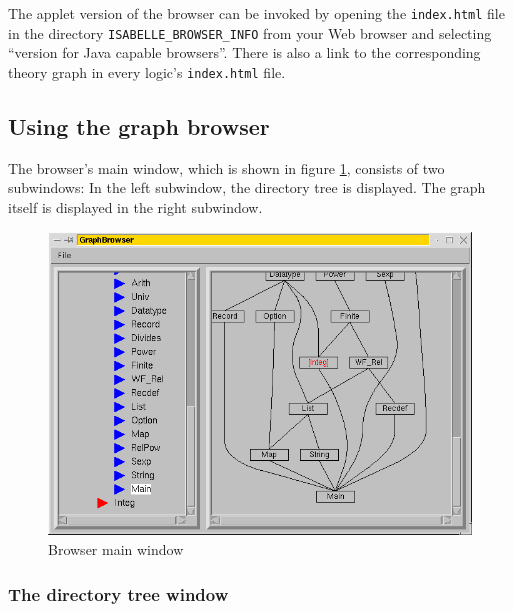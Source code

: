\medskip The applet version of the browser can be invoked by opening
the {\tt index.html} file in the directory
\texttt{ISABELLE_BROWSER_INFO} from your Web browser and selecting
``version for Java capable browsers''.  There is also a link to the
corresponding theory graph in every logic's {\tt index.html} file.


\subsection{Using the graph browser}

The browser's main window, which is shown in figure
\ref{browserwindow}, consists of two subwindows: In the left
subwindow, the directory tree is displayed. The graph itself is
displayed in the right subwindow.
\begin{figure}[h]
  \includegraphics[width=\textwidth]{browser_screenshot}
  \caption{\label{browserwindow} Browser main window}
\end{figure}


\subsubsection*{The directory tree window}

